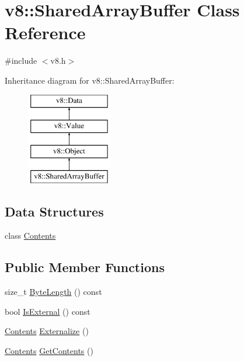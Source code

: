 \hypertarget{classv8_1_1SharedArrayBuffer}{}\section{v8\+:\+:Shared\+Array\+Buffer Class Reference}
\label{classv8_1_1SharedArrayBuffer}


{\ttfamily \#include $<$v8.\+h$>$}

Inheritance diagram for v8\+:\+:Shared\+Array\+Buffer\+:\begin{figure}[H]
\begin{center}
\leavevmode
\includegraphics[height=4.000000cm]{classv8_1_1SharedArrayBuffer}
\end{center}
\end{figure}
\subsection*{Data Structures}
\begin{DoxyCompactItemize}
\item 
class \mbox{\hyperlink{classv8_1_1SharedArrayBuffer_1_1Contents}{Contents}}
\end{DoxyCompactItemize}
\subsection*{Public Member Functions}
\begin{DoxyCompactItemize}
\item 
size\+\_\+t \mbox{\hyperlink{classv8_1_1SharedArrayBuffer_a746f2632ad6c2d80e8f2e5e6e5b77f94}{Byte\+Length}} () const
\item 
bool \mbox{\hyperlink{classv8_1_1SharedArrayBuffer_adcbceac6432955c7d54fceea27c92b73}{Is\+External}} () const
\item 
\mbox{\hyperlink{classv8_1_1SharedArrayBuffer_1_1Contents}{Contents}} \mbox{\hyperlink{classv8_1_1SharedArrayBuffer_afe025bbf668e64439cfc0044b353eb41}{Externalize}} ()
\item 
\mbox{\hyperlink{classv8_1_1SharedArrayBuffer_1_1Contents}{Contents}} \mbox{\hyperlink{classv8_1_1SharedArrayBuffer_af5a160b645c5c674450d9501697c2cf4}{Get\+Contents}} ()
\end{DoxyCompactItemize}
